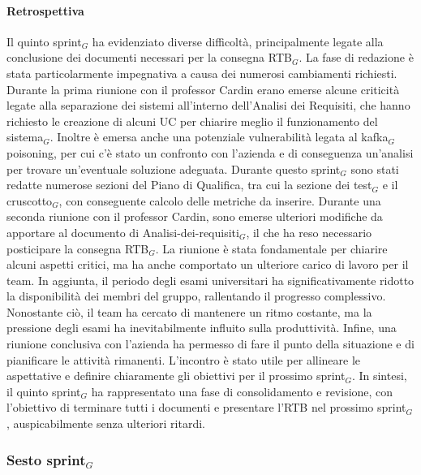 \documentclass[10pt]{article}
\begin{document}
{{{{{{    \paragraph{Retrospettiva}\mbox{}\vspace{0.4em}

    Il quinto sprint$_G$ ha evidenziato diverse difficoltà, principalmente legate alla conclusione dei documenti necessari per la consegna RTB$_G$. La fase di redazione è stata particolarmente impegnativa a causa dei numerosi cambiamenti richiesti.
    Durante la prima riunione con il professor Cardin erano emerse alcune criticità legate alla separazione dei sistemi all'interno dell'Analisi dei Requisiti, che hanno richiesto le creazione di alcuni UC per chiarire meglio il funzionamento del sistema$_G$. 
    Inoltre è emersa anche una potenziale vulnerabilità legata al kafka$_G$ poisoning, per cui c'è stato un confronto con l'azienda e di conseguenza un'analisi per trovare un'eventuale soluzione adeguata.
    Durante questo sprint$_G$ sono stati redatte numerose sezioni del Piano di Qualifica, tra cui la sezione dei test$_G$ e  il cruscotto$_G$, con conseguente calcolo delle metriche da inserire.
    Durante una seconda riunione con il professor Cardin, sono emerse ulteriori modifiche da apportare al documento di Analisi-dei-requisiti$_G$, il che ha reso necessario posticipare la consegna RTB$_G$. 
    La riunione è stata fondamentale per chiarire alcuni aspetti critici, ma ha anche comportato un ulteriore carico di lavoro per il team.
    In aggiunta, il periodo degli esami universitari ha significativamente ridotto la disponibilità dei membri del gruppo, rallentando il progresso complessivo. 
    Nonostante ciò, il team ha cercato di mantenere un ritmo costante, ma la pressione degli esami ha inevitabilmente influito sulla produttività.
    Infine, una riunione conclusiva con l'azienda ha permesso di fare il punto della situazione e di pianificare le attività rimanenti. L'incontro è stato utile per allineare le aspettative e definire chiaramente gli obiettivi per il prossimo sprint$_G$. 
    In sintesi, il quinto sprint$_G$ ha rappresentato una fase di consolidamento e revisione, con l'obiettivo di terminare tutti i documenti e presentare l'RTB nel prossimo sprint$_G$, auspicabilmente senza ulteriori ritardi.



\newpage
\subsubsection{Sesto sprint$_G$}
\label{sesto-sprint$_G$}
    
}}}}}}
\end{document}
